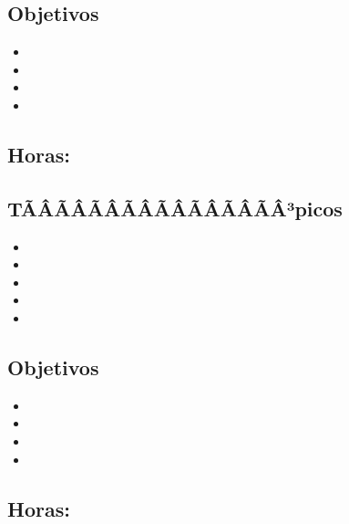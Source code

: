 \subsection*{Objetivos}
\begin{itemize}
	\item \DSCUATROObjUNO
	\item \DSCUATROObjDOS
	\item \DSCUATROObjTRES
	\item \DSCUATROObjCUATRO
\end{itemize}

\subsection{\DSCINCODef}\label{sec:BOK-DS5}
\subsection*{Horas: \DSCINCOHours}

\subsection*{TÃÂÃÂÃÂÃÂÃÂÃÂÃÂÃÂ³picos}
\begin{itemize}
	\item \DSCINCOTopicArboles
	\item \DSCINCOTopicGrafos
	\item \DSCINCOTopicGrafosdirigidos
	\item \DSCINCOTopicArbolesde
	\item \DSCINCOTopicEstrategias
\end{itemize}

\subsection*{Objetivos}
\begin{itemize}
	\item \DSCINCOObjUNO
	\item \DSCINCOObjDOS
	\item \DSCINCOObjTRES
	\item \DSCINCOObjCUATRO
\end{itemize}

\subsection{\DSSEISDef}\label{sec:BOK-DS6}
\subsection*{Horas: \DSSEISHours}

